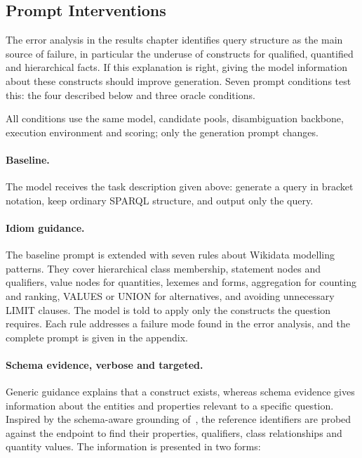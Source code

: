 \subsection{Prompt Interventions}

\label{sec:method-prompts}

The error analysis in the results chapter identifies query structure as the main source of failure, in particular the underuse of constructs for qualified, quantified and hierarchical facts.
If this explanation is right, giving the model information about these constructs should improve generation.
Seven prompt conditions test this: the four described below and three oracle conditions.

All conditions use the same model, candidate pools, disambiguation backbone, execution environment and scoring; only the generation prompt changes.

\paragraph{Baseline.}

The model receives the task description given above: generate a query in bracket notation, keep ordinary SPARQL structure, and output only the query.

\paragraph{Idiom guidance.}

The baseline prompt is extended with seven rules about Wikidata modelling patterns.
They cover hierarchical class membership, statement nodes and qualifiers, value nodes for quantities, lexemes and forms, aggregation for counting and ranking, VALUES or UNION for alternatives, and avoiding unnecessary LIMIT clauses.
The model is told to apply only the constructs the question requires.
Each rule addresses a failure mode found in the error analysis, and the complete prompt is given in the appendix.

\paragraph{Schema evidence, verbose and
targeted.}

Generic guidance explains that a construct exists, whereas schema evidence gives information about the entities and properties relevant to a specific question.
Inspired by the schema-aware grounding of~\parencite{zhang2026saga}, the reference identifiers are probed against the endpoint to find their properties, qualifiers, class relationships and quantity values.
The information is presented in two forms:

